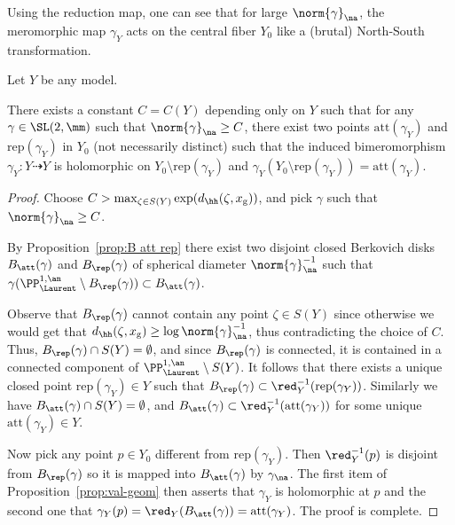 Using the reduction map, one can see that for large $\norm{\gamma}_\na$, the meromorphic map $\gamma_Y$ acts on the central fiber $Y_0$ like a (brutal) North-South transformation.

\begin{prop}\label{prop:nordsud}
Let $Y$ be any model.

There exists a constant $C=C(Y)$ depending only on $Y$ such that for any $\gamma \in \SL(2,\mm)$ such that $\norm{\gamma}_\na\geq C$, there exist two points $\mathrm{att}(\gamma_Y)$ and $\mathrm{rep}(\gamma_Y)$ in $Y_0$ (not necessarily distinct) such that the induced bimeromorphism $\gamma_Y: Y \dashrightarrow Y$ is holomorphic on $Y_0\setminus \mathrm{rep}(\gamma_Y)$ and $\gamma_Y(Y_0\setminus \mathrm{rep}(\gamma_Y)) = \mathrm{att}(\gamma_Y)$.
\end{prop}
\begin{proof}
Choose $C > \max_{\zeta \in S(Y)} \exp(d_\hh (\zeta, x_{\mathrm{g}}))$, and pick $\gamma$ such that $\norm{\gamma}_\na\geq C$.

By Proposition~\ref{prop:B att rep} there exist two disjoint closed Berkovich disks $B_{\att}(\gamma)$ and $B_{\rep}(\gamma)$ of spherical diameter $\norm{\gamma}^{-1}_\na$ such that $\gamma (\PP^{1,\an}_{\Laurent}\setminus B_{\rep}(\gamma)) \subset B_{\att}(\gamma)$.

Observe that $ B_{\rep}(\gamma)$ cannot contain any point $\zeta \in S(Y)$ since otherwise we would get that $d_\hh (\zeta, x_{\mathrm{g}}) \ge \log \norm{\gamma}_\na^{-1}$, thus contradicting the choice of $C$. Thus, $ B_{\rep}(\gamma) \cap S(Y) = \emptyset$, and since $B_{\rep}(\gamma)$ is connected, it is contained in a connected component of $\PP^{1,\an}_{\Laurent}\setminus S(Y)$. It follows that there exists a unique closed point $\mathrm{rep}(\gamma_Y)\in Y$ such that $B_{\rep}(\gamma) \subset \red_Y^{-1}(\mathrm{rep}(\gamma_Y))$. Similarly we have $B_{\att}(\gamma) \cap S(Y) = \emptyset$, and $B_{\att}(\gamma)\subset \red_Y^{-1}(\mathrm{att}(\gamma_Y))$ for some unique $\mathrm{att}(\gamma_Y)\in Y$.

Now pick any point $p \in Y_0$ different from $\mathrm{rep}(\gamma_Y)$. Then $\red_Y^{-1}(p)$ is disjoint from $B_{\rep}(\gamma)$ so it is mapped into $B_{\att}(\gamma)$ by $\gamma_\na$. The first item of Proposition~\ref{prop:val-geom} then asserts that $\gamma_{Y}$ is holomorphic at $p$ and the second one that $\gamma_{Y}(p) =\red_Y(B_{\att}(\gamma)) = \mathrm{att}(\gamma_Y)$. The proof is complete.
\end{proof}

